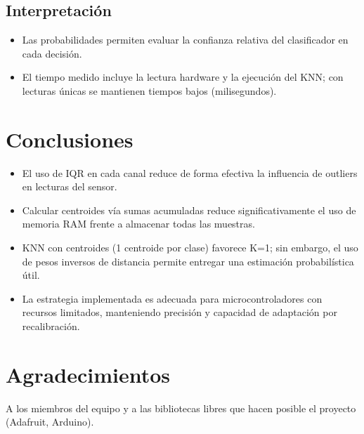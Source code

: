 \documentclass[conference]{IEEEtran}
\begin{document}
\subsection{Interpretación}
\begin{itemize}
  \item Las probabilidades permiten evaluar la confianza relativa del clasificador en cada decisión.
  \item El tiempo medido incluye la lectura hardware y la ejecución del KNN; con lecturas únicas se mantienen tiempos bajos (milisegundos).
\end{itemize}

\section{Conclusiones}
\begin{itemize}
  \item El uso de IQR en cada canal reduce de forma efectiva la influencia de outliers en lecturas del sensor.
  \item Calcular centroides vía sumas acumuladas reduce significativamente el uso de memoria RAM frente a almacenar todas las muestras.
  \item KNN con centroides (1 centroide por clase) favorece K=1; sin embargo, el uso de pesos inversos de distancia permite entregar una estimación probabilística útil.
  \item La estrategia implementada es adecuada para microcontroladores con recursos limitados, manteniendo precisión y capacidad de adaptación por recalibración.
\end{itemize}

\section*{Agradecimientos}
A los miembros del equipo y a las bibliotecas libres que hacen posible el proyecto (Adafruit, Arduino).

\vfill
\end{document}
